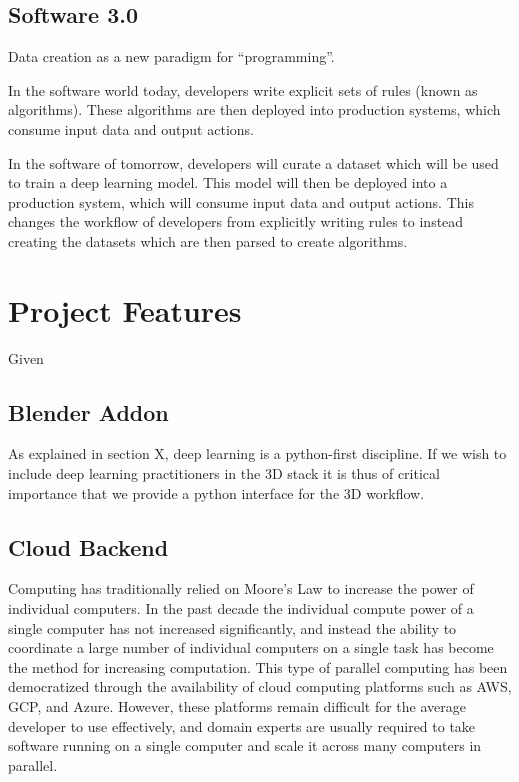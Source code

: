 \documentclass{article}
\begin{document}
\subsection{Software 3.0}
\label{sec:software3.0}

Data creation as a new paradigm for “programming”.

In the software world today, developers write explicit sets of rules (known as algorithms). These algorithms are then deployed into production systems, which consume input data and output actions.

In the software of tomorrow, developers will curate a dataset which will be used to train a deep learning model. This model will then be deployed into a production system, which will consume input data and output actions. This changes the workflow of developers from explicitly writing rules to instead creating the datasets which are then parsed to create algorithms.

\section{Project Features}
\label{sec:projectfeatures}

Given 

\subsection{Blender Addon}
\label{sec:blenderaddon}

As explained in section X, deep learning is a python-first discipline. If we wish to include deep learning practitioners in the 3D stack it is thus of critical importance that we provide a python interface for the 3D workflow.

\subsection{Cloud Backend}
\label{sec:cloudbackend}

Computing has traditionally relied on Moore’s Law to increase the power of individual computers. In the past decade the individual compute power of a single computer has not increased significantly, and instead the ability to coordinate a large number of individual computers on a single task has become the method for increasing computation. This type of parallel computing has been democratized through the availability of cloud computing platforms such as AWS, GCP, and Azure. However, these platforms remain difficult for the average developer to use effectively, and domain experts are usually required to take software running on a single computer and scale it across many computers in parallel.
\end{document}
